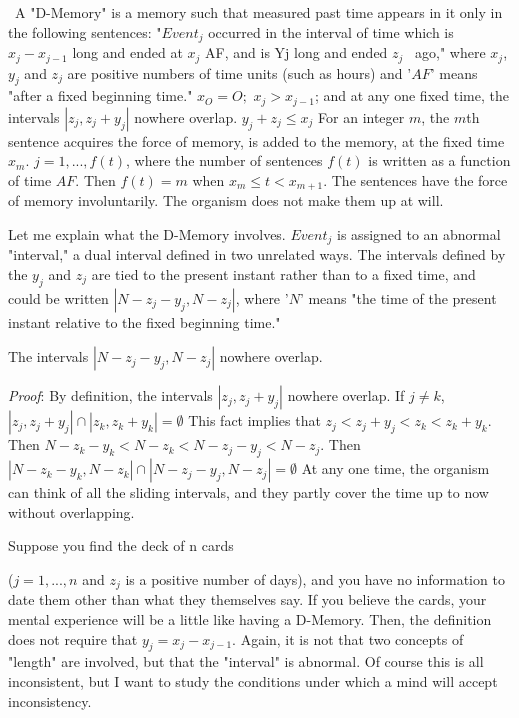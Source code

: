 \ A "D-Memory" is a memory such that measured past time 
appears in it only in the following sentences: "$Event_j$ occurred in the interval 
of time which is $x_j-x_{j-1}$ long and ended at $x_j$ AF, and is Yj long and ended $z_j$
\ ago," where $x_j$, $y_j$ and $z_j$ are positive numbers of time units (such as hours) 
and '$AF$' means "after a fixed beginning time." $x_O=O;$ $x_j> x_{j-1}$; and at any 
one fixed time, the intervals $|z_j, z_j+y_j|$ nowhere overlap. $y_j+z_j\leq x_j$ For an
integer $m$, the $m$th sentence acquires the force of memory, is added to the 
memory, at the fixed time $x_m$. $j=1, ..., f(t)$, where the number of sentences 
$f(t)$ is written as a function of time $AF$. Then $f(t)=m$ when $x_m \leq t \less x_{m+1}$. 
The sentences have the force of memory involuntarily. The organism does 
not make them up at will. 

Let me explain what the D-Memory involves. $Event_j$ is assigned to an 
abnormal "interval," a dual interval defined in two unrelated ways. The 
intervals defined by the $y_j$ and $z_j$ are tied to the present instant rather than to 
a fixed time, and could be written $|N-z_j-y_j, N-z_j|$, where '$N$' means "the time 
of the present instant relative to the fixed beginning time." 

\newcommand{\proof}{\textit{Proof}}

 The intervals $|N-z_j-y_j, N-z_j|$ nowhere overlap. 

\proof: By definition, the intervals $|z_j, z_j+y_j|$ nowhere overlap. If $j\neq k$,
$|z_j, z_j+y_j|\cap|z_k, z_k+y_k|=\emptyset$ 
This fact implies that \eg $z_j\less z_j+y_j\less z_k\less z_k+y_k$.
Then $N-z_k-y_k\less N-z_k\less N-z_j-y_j\less N-z_j$.
Then $|N-z_k-y_k, N-z_k|\cap|N-z_j-y_j, N-z_j|=\emptyset$
At any one time, the organism can think of all the sliding intervals, and they 
partly cover the time up to now without overlapping. 

Suppose you find the deck of n cards 

{ \centering
{}}


($j=1,...,n$ and $z_j$ is a positive number of days), and you have no 
information to date them other than what they themselves say. If you 
believe the cards, your mental experience will be a little like having a 
D-Memory. Then, the definition does not require that $y_j=x_j-x_{j-1}$. Again, it is 
not that two concepts of "length" are involved, but that the "interval" is 
abnormal. Of course this is all inconsistent, but I want to study the 
conditions under which a mind will accept inconsistency. 

